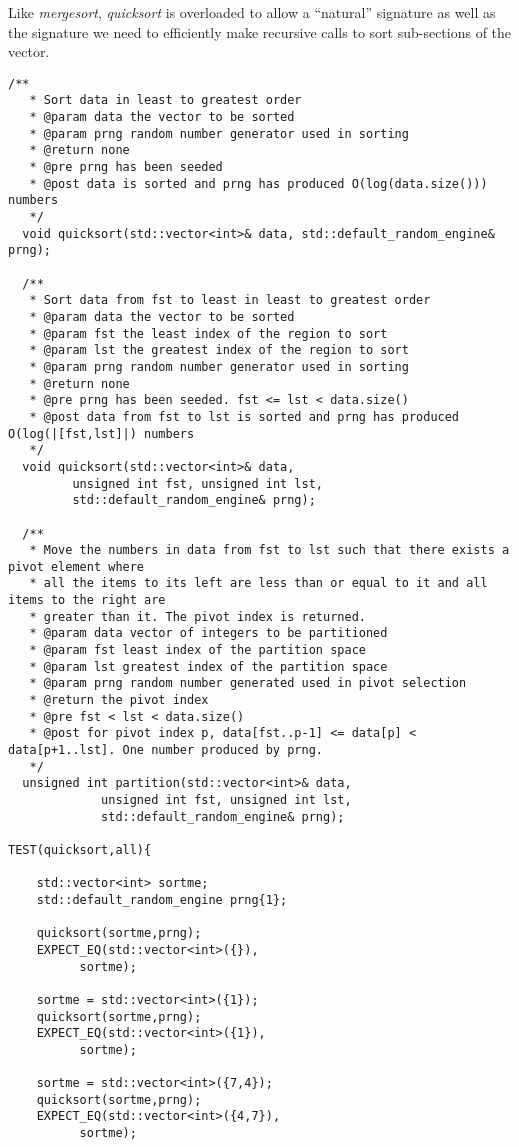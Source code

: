 \documentclass[]{tufte-handout}
\begin{document}
Like \textit{mergesort}, \textit{quicksort} is overloaded to allow a ``natural'' signature as well as the signature we need to efficiently make recursive calls to sort sub-sections of the vector. 

\begin{verbatim}
/**
   * Sort data in least to greatest order
   * @param data the vector to be sorted
   * @param prng random number generator used in sorting
   * @return none
   * @pre prng has been seeded
   * @post data is sorted and prng has produced O(log(data.size())) numbers
   */
  void quicksort(std::vector<int>& data, std::default_random_engine& prng);

  /**
   * Sort data from fst to least in least to greatest order
   * @param data the vector to be sorted
   * @param fst the least index of the region to sort
   * @param lst the greatest index of the region to sort
   * @param prng random number generator used in sorting
   * @return none
   * @pre prng has been seeded. fst <= lst < data.size()
   * @post data from fst to lst is sorted and prng has produced O(log(|[fst,lst]|) numbers
   */
  void quicksort(std::vector<int>& data, 
		 unsigned int fst, unsigned int lst, 
		 std::default_random_engine& prng);

  /**
   * Move the numbers in data from fst to lst such that there exists a pivot element where
   * all the items to its left are less than or equal to it and all items to the right are
   * greater than it. The pivot index is returned.
   * @param data vector of integers to be partitioned
   * @param fst least index of the partition space
   * @param lst greatest index of the partition space
   * @param prng random number generated used in pivot selection
   * @return the pivot index
   * @pre fst < lst < data.size()
   * @post for pivot index p, data[fst..p-1] <= data[p] < data[p+1..lst]. One number produced by prng.
   */
  unsigned int partition(std::vector<int>& data, 
			 unsigned int fst, unsigned int lst, 
			 std::default_random_engine& prng);  
			 
TEST(quicksort,all){
    
    std::vector<int> sortme;
    std::default_random_engine prng{1};

    quicksort(sortme,prng);
    EXPECT_EQ(std::vector<int>({}),
	      sortme);

    sortme = std::vector<int>({1});
    quicksort(sortme,prng);
    EXPECT_EQ(std::vector<int>({1}),
	      sortme);

    sortme = std::vector<int>({7,4});
    quicksort(sortme,prng);
    EXPECT_EQ(std::vector<int>({4,7}),
	      sortme);


\end{verbatim}
\end{document}
